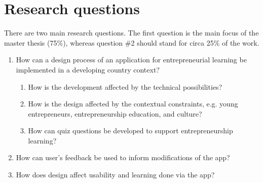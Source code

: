 \section{Research questions} 

There are two main research questions. The first question is the main focus of the master thesis (75\%), whereas question \#2 should stand for circa 25\% of the work.

\begin{enumerate}
    \item How can a design process of an application for entrepreneurial learning be implemented in a developing country context? %
    \begin{enumerate}
        \item How is the development affected by the technical possibilities?
\item How is the design affected by the contextual  constraints, e.g. young entrepreneurs, entrepreneurship education, and culture? %
        \item How can quiz questions be developed to support entrepreneurship learning? %
    \end{enumerate}
    \item How can user’s feedback be used to inform modifications of the app?
    \item How does design affect usability and learning done via the app? %
	\end{enumerate}




